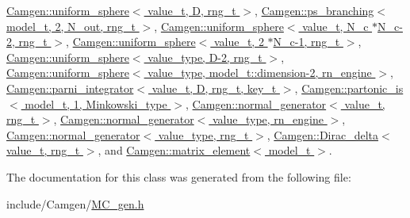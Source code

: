 \hyperlink{a00566_a229e39ea995845bd2e381143502deb43}{Camgen\+::uniform\+\_\+sphere$<$ value\+\_\+t, D, rng\+\_\+t $>$}, \hyperlink{a00445_afd6381ce5a2d653a8389c305460a6ecb}{Camgen\+::ps\+\_\+branching$<$ model\+\_\+t, 2, N\+\_\+out, rng\+\_\+t $>$}, \hyperlink{a00566_a229e39ea995845bd2e381143502deb43}{Camgen\+::uniform\+\_\+sphere$<$ value\+\_\+t, N\+\_\+c $\ast$\+N\+\_\+c-\/2, rng\+\_\+t $>$}, \hyperlink{a00566_a229e39ea995845bd2e381143502deb43}{Camgen\+::uniform\+\_\+sphere$<$ value\+\_\+t, 2 $\ast$\+N\+\_\+c-\/1, rng\+\_\+t $>$}, \hyperlink{a00566_a229e39ea995845bd2e381143502deb43}{Camgen\+::uniform\+\_\+sphere$<$ value\+\_\+type, D-\/2, rng\+\_\+t $>$}, \hyperlink{a00566_a229e39ea995845bd2e381143502deb43}{Camgen\+::uniform\+\_\+sphere$<$ value\+\_\+type, model\+\_\+t\+::dimension-\/2, rn\+\_\+engine $>$}, \hyperlink{a00395_a2f50fc4c21724fbe2f6d3b5579cb5f3f}{Camgen\+::parni\+\_\+integrator$<$ value\+\_\+t, D, rng\+\_\+t, key\+\_\+t $>$}, \hyperlink{a00413_a0dc3e17f5e62711bee89a872b66a6a73}{Camgen\+::partonic\+\_\+is$<$ model\+\_\+t, 1, Minkowski\+\_\+type $>$}, \hyperlink{a00385_abe9367101dcd82fa1b9026634c4ec3b6}{Camgen\+::normal\+\_\+generator$<$ value\+\_\+t, rng\+\_\+t $>$}, \hyperlink{a00385_abe9367101dcd82fa1b9026634c4ec3b6}{Camgen\+::normal\+\_\+generator$<$ value\+\_\+type, rn\+\_\+engine $>$}, \hyperlink{a00385_abe9367101dcd82fa1b9026634c4ec3b6}{Camgen\+::normal\+\_\+generator$<$ value\+\_\+type, rng\+\_\+t $>$}, \hyperlink{a00128_a59d3743064b415831c92af47498cb257}{Camgen\+::\+Dirac\+\_\+delta$<$ value\+\_\+t, rng\+\_\+t $>$}, and \hyperlink{a00363_a2752785ce5787d0fd58247b5e6a838c0}{Camgen\+::matrix\+\_\+element$<$ model\+\_\+t $>$}.



The documentation for this class was generated from the following file\+:\begin{DoxyCompactItemize}
\item 
include/\+Camgen/\hyperlink{a00691}{M\+C\+\_\+gen.\+h}\end{DoxyCompactItemize}
